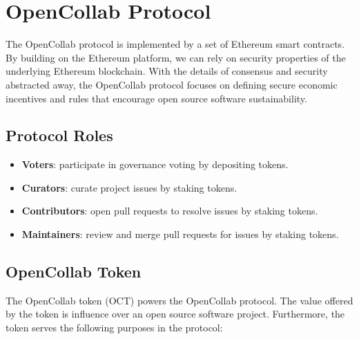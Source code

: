 \section{OpenCollab Protocol}
\label{sec:protocol}

The OpenCollab protocol is implemented by a set of Ethereum smart contracts. By
building on the Ethereum platform, we can rely on security properties of the
underlying Ethereum blockchain. With the details of consensus and security
abstracted away, the OpenCollab protocol focuses on defining secure economic incentives
and rules that encourage open source software sustainability.

\subsection{Protocol Roles}

\begin{itemize}
  \item \textbf{Voters}: participate in governance voting by depositing tokens.
  \item \textbf{Curators}: curate project issues by staking tokens.
  \item \textbf{Contributors}: open pull requests to resolve issues by staking tokens.
  \item \textbf{Maintainers}: review and merge pull requests for issues by
    staking tokens.
\end{itemize}

\subsection{OpenCollab Token}

The OpenCollab token (OCT) powers the OpenCollab protocol. The value offered by
the token is influence over an open source software project. Furthermore, the
token serves the following purposes in the protocol:

